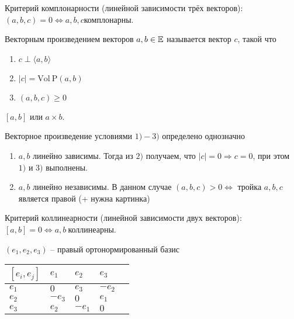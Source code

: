 Критерий комплонарности (линейной зависимости трёх векторов): $(a, b, c) = 0 \iff a, b, c \text{комплонарны}$.

\begin{Def}
  Векторным произведением векторов $a, b \in \mathbb{E}$ называется вектор $c$, такой что
  \begin{enumerate}
    \item $c \perp \langle a, b \rangle$
    \item $|c| = \mathrm{Vol\ P}(a, b)$
    \item $(a, b, c) \geqslant 0$
  \end{enumerate}
  \begin{Designation}
    $[a, b]$ или $a \times b$.
  \end{Designation}
\end{Def}

\begin{Note}
  Векторное произведение условиями $1) - 3)$ определено однозначно
  \begin{enumerate}
    \item $a, b$ линейно зависимы. Тогда из $2)$ получаем, что $|c| = 0 \Rightarrow c = 0$, при этом $1)$ и $3)$ выполнены.
    \item $a, b$ линейно независимы. В данном случае $(a, b, c) > 0 \iff $ тройка $a, b, c$ является правой (+ нужна картинка)
  \end{enumerate}
\end{Note}

Критерий коллинеарности (линейной зависимости двух векторов): $[a, b] = 0 \iff a, b\ \text{коллинеарны}$.

\begin{Examples}
  $(e_1, e_2, e_3)$ -- правый ортонормированный базис
  \begin{table}[h]
    \centering
    \begin{tabular}{l|l|l|l|l}
     $[e_i, e_j]$ & $e_1$ & $e_2$  & $e_3$   \\ \hline
      $e_1$       & $0$                        & $e_3$  & $-e_2$  \\ \hline
      $e_2$       & $-e_3$                     & $0$    & $e_1$   \\ \hline
      $e_3$       & $e_2$                      & $-e_1$ & $0$
    \end{tabular}
  \end{table}
\end{Examples}

